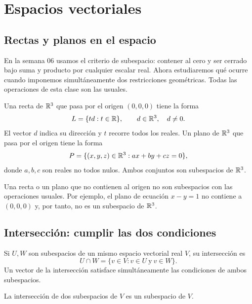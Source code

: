 \documentclass[compacto,10pt]{pubciencias-notas}
\begin{document}
\encabezado
\vspace*{-8mm}
\setcounter{section}{3}
\section{Espacios vectoriales}
\subsection{Rectas y planos en el espacio}

En la semana 06 usamos el criterio de subespacio: contener al cero y ser
cerrado bajo suma y producto por cualquier escalar real. Ahora estudiaremos
qué ocurre cuando imponemos simultáneamente dos restricciones geométricas.
Todas las operaciones de esta clase son las usuales.

\begin{defi}
    Una recta de $\mathbb{R}^3$ que pasa por el origen $(0,0,0)$ tiene la forma
    \[
        L=\{td:t\in\mathbb{R}\},\qquad d\in\mathbb{R}^3,\quad d\ne0.
    \]
    El vector $d$ indica su dirección y $t$ recorre todos los reales.
    Un plano de $\mathbb{R}^3$ que pasa por el origen tiene la forma
    \[
        P=\{(x,y,z)\in\mathbb{R}^3:ax+by+cz=0\},
    \]
    donde $a,b,c$ son reales no todos nulos.
    Ambos conjuntos son subespacios de $\mathbb{R}^3$.
\end{defi}

\begin{advertencia}
    Una recta o un plano que no contienen al origen no son subespacios
    con las operaciones usuales. Por ejemplo, el plano de ecuación
    $x-y=1$ no contiene a $(0,0,0)$ y, por tanto, no es un subespacio
    de $\mathbb{R}^3$.
\end{advertencia}

\subsection{Intersección: cumplir las dos condiciones}

\begin{defi}
    Si $U,W$ son subespacios de un mismo espacio vectorial real $V$,
    su intersección es
    \[
        U\cap W=\{v\in V:v\in U\ \text{y}\ v\in W\}.
    \]
    Un vector de la intersección satisface simultáneamente las condiciones
    de ambos subespacios.
\end{defi}

\begin{teo}
    La intersección de dos subespacios de $V$ es un subespacio de $V$.
\end{teo}
\end{document}
